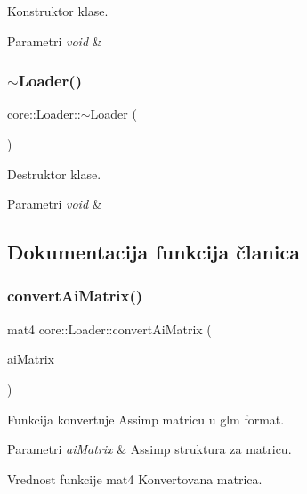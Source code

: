 Konstruktor klase. 


\begin{DoxyParams}{Parametri}
{\em void} & \\
\hline
\end{DoxyParams}
\mbox{\label{classcore_1_1Loader_a16110f8585d6f746307d1d145a1d6f04}} 
\subsubsection{\texorpdfstring{$\sim$\+Loader()}{~Loader()}}
{\footnotesize\ttfamily core\+::\+Loader\+::$\sim$\+Loader (\begin{DoxyParamCaption}{ }\end{DoxyParamCaption})}



Destruktor klase. 


\begin{DoxyParams}{Parametri}
{\em void} & \\
\hline
\end{DoxyParams}


\subsection{Dokumentacija funkcija članica}
\mbox{\label{classcore_1_1Loader_a4d635316740767d7aaebc7bf0c52ebe2}} 
\subsubsection{\texorpdfstring{convert\+Ai\+Matrix()}{convertAiMatrix()}}
{\footnotesize\ttfamily mat4 core\+::\+Loader\+::convert\+Ai\+Matrix (\begin{DoxyParamCaption}\item[{ai\+Matrix4x4}]{ai\+Matrix }\end{DoxyParamCaption})\hspace{0.3cm}{\ttfamily [private]}}



Funkcija konvertuje Assimp matricu u glm format. 


\begin{DoxyParams}{Parametri}
{\em ai\+Matrix} & Assimp struktura za matricu. \\
\hline
\end{DoxyParams}
\begin{DoxyReturn}{Vrednost funkcije}
mat4 Konvertovana matrica. 
\end{DoxyReturn}
\mbox{\label{classcore_1_1Loader_aae32d85640af5eb6d4a9c8e27fc0e83e}} 

